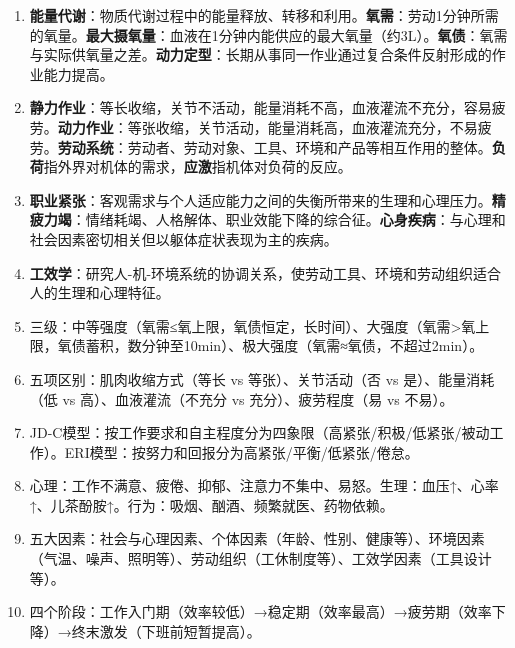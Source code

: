 \begin{enumerate}[leftmargin=*, itemsep=5pt]
    \item \textbf{能量代谢}：物质代谢过程中的能量释放、转移和利用。\textbf{氧需}：劳动1分钟所需的氧量。\textbf{最大摄氧量}：血液在1分钟内能供应的最大氧量（约3L）。\textbf{氧债}：氧需与实际供氧量之差。\textbf{动力定型}：长期从事同一作业通过复合条件反射形成的作业能力提高。
    \item \textbf{静力作业}：等长收缩，关节不活动，能量消耗不高，血液灌流不充分，容易疲劳。\textbf{动力作业}：等张收缩，关节活动，能量消耗高，血液灌流充分，不易疲劳。\textbf{劳动系统}：劳动者、劳动对象、工具、环境和产品等相互作用的整体。\textbf{负荷}指外界对机体的需求，\textbf{应激}指机体对负荷的反应。
    \item \textbf{职业紧张}：客观需求与个人适应能力之间的失衡所带来的生理和心理压力。\textbf{精疲力竭}：情绪耗竭、人格解体、职业效能下降的综合征。\textbf{心身疾病}：与心理和社会因素密切相关但以躯体症状表现为主的疾病。
    \item \textbf{工效学}：研究人-机-环境系统的协调关系，使劳动工具、环境和劳动组织适合人的生理和心理特征。
    \item 三级：中等强度（氧需≤氧上限，氧债恒定，长时间）、大强度（氧需>氧上限，氧债蓄积，数分钟至10min）、极大强度（氧需≈氧债，不超过2min）。
    \item 五项区别：肌肉收缩方式（等长 vs 等张）、关节活动（否 vs 是）、能量消耗（低 vs 高）、血液灌流（不充分 vs 充分）、疲劳程度（易 vs 不易）。
    \item JD-C模型：按工作要求和自主程度分为四象限（高紧张/积极/低紧张/被动工作）。ERI模型：按努力和回报分为高紧张/平衡/低紧张/倦怠。
    \item 心理：工作不满意、疲倦、抑郁、注意力不集中、易怒。生理：血压↑、心率↑、儿茶酚胺↑。行为：吸烟、酗酒、频繁就医、药物依赖。
    \item 五大因素：社会与心理因素、个体因素（年龄、性别、健康等）、环境因素（气温、噪声、照明等）、劳动组织（工休制度等）、工效学因素（工具设计等）。
    \item 四个阶段：工作入门期（效率较低）→稳定期（效率最高）→疲劳期（效率下降）→终末激发（下班前短暂提高）。
\end{enumerate}

\newpage
\newpage